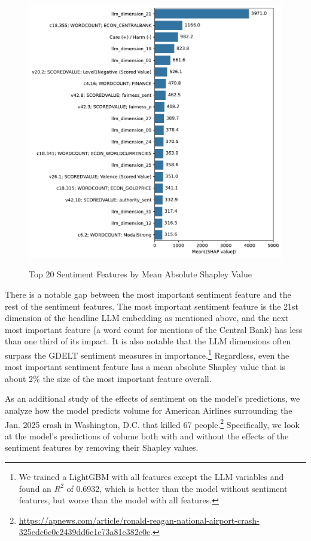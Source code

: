 \documentclass[12pt]{article}
\begin{document}
\begin{figure}[H]
    \centering
    \caption{Top 20 Sentiment Features by Mean Absolute Shapley Value}
    \includegraphics[width=0.75\linewidth]{../Output/shap_abs_sentiment_top20.pdf}
    \label{fig:shapley_sentiment_top20}
\end{figure}

There is a notable gap between the most important sentiment feature and the rest of the sentiment features. The most important sentiment feature is the 21st dimension of the headline LLM embedding as mentioned above, and the next most important feature (a word count for mentions of the Central Bank) has less than one third of its impact. It is also notable that the LLM dimensions often surpass the GDELT sentiment measures in importance.\footnote{We trained a LightGBM with all features except the LLM variables and found an $R^2$ of 0.6932, which is better than the model without sentiment features, but worse than the model with all features.} Regardless, even the most important sentiment feature has a mean absolute Shapley value that is about 2\% the size of the most important feature overall.

As an additional study of the effects of sentiment on the model's predictions, we analyze how the model predicts volume for American Airlines surrounding the Jan. 2025 crash in Washington, D.C. that killed 67 people.\footnote{\url{https://apnews.com/article/ronald-reagan-national-airport-crash-325edc6c0c2439dd6c1e73a81e382c0e}.} Specifically, we look at the model's predictions of volume both with and without the effects of the sentiment features by removing their Shapley values.
\end{document}
